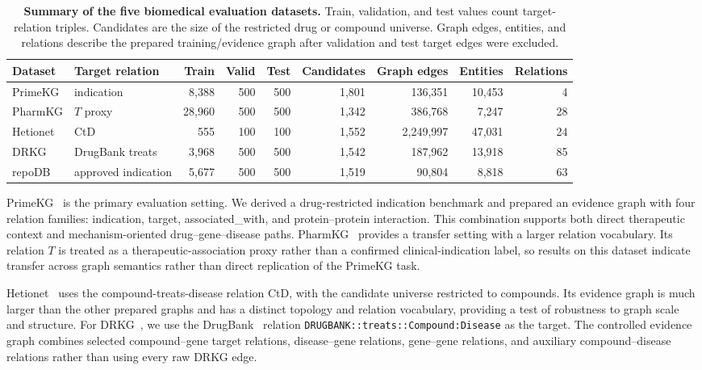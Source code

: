 \documentclass[pdflatex,sn-mathphys-num]{sn-jnl}
\begin{document}
\begin{table}[!t]
\caption{\textbf{Summary of the five biomedical evaluation datasets.} Train, validation, and test values count target-relation triples. Candidates are the size of the restricted drug or compound universe. Graph edges, entities, and relations describe the prepared training/evidence graph after validation and test target edges were excluded.}
\label{tab:dataset_summary}
\centering
{\fontsize{8.0pt}{8.8pt}\selectfont
\setlength{\tabcolsep}{2.2pt}
\renewcommand{\arraystretch}{1.08}
\begin{tabular*}{\textwidth}{@{\extracolsep{\fill}}llrrrrrrr@{}}
\toprule
Dataset & Target relation & Train & Valid & Test & Candidates & Graph edges & Entities & Relations \\
\midrule
PrimeKG & indication & 8,388 & 500 & 500 & 1,801 & 136,351 & 10,453 & 4 \\
PharmKG & $T$ proxy & 28,960 & 500 & 500 & 1,342 & 386,768 & 7,247 & 28 \\
Hetionet & CtD & 555 & 100 & 100 & 1,552 & 2,249,997 & 47,031 & 24 \\
DRKG & DrugBank treats & 3,968 & 500 & 500 & 1,542 & 187,962 & 13,918 & 85 \\
repoDB & approved indication & 5,677 & 500 & 500 & 1,519 & 90,804 & 8,818 & 63 \\
\bottomrule
\end{tabular*}}
\end{table}

PrimeKG~\citep{chandak2023building} is the primary evaluation setting. We derived a drug-restricted indication benchmark and prepared an evidence graph with four relation families: indication, target, associated\_with, and protein--protein interaction. This combination supports both direct therapeutic context and mechanism-oriented drug--gene--disease paths. PharmKG~\citep{zheng2021pharmkg} provides a transfer setting with a larger relation vocabulary. Its relation $T$ is treated as a therapeutic-association proxy rather than a confirmed clinical-indication label, so results on this dataset indicate transfer across graph semantics rather than direct replication of the PrimeKG task.

Hetionet~\citep{himmelstein2017systematic} uses the compound-treats-disease relation CtD, with the candidate universe restricted to compounds. Its evidence graph is much larger than the other prepared graphs and has a distinct topology and relation vocabulary, providing a test of robustness to graph scale and structure. For DRKG~\citep{drkg2020}, we use the DrugBank~\citep{wishart2018drugbank} relation \texttt{DRUGBANK::treats::Compound:Disease} as the target. The controlled evidence graph combines selected compound--gene target relations, disease--gene relations, gene--gene relations, and auxiliary compound--disease relations rather than using every raw DRKG edge.
\end{document}
